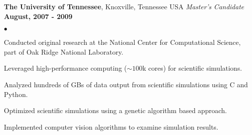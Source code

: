 \documentclass[margin,line, 11pt]{res}
\newenvironment{list2}{
  \begin{list}{$\bullet$}{%
      \setlength{\itemsep}{0in}
      \setlength{\parsep}{0in} \setlength{\parskip}{0in}
      \setlength{\topsep}{0in} \setlength{\partopsep}{0in}
      \setlength{\leftmargin}{0.2in}}}{\end{list}}
\begin{document}
\begin{resume}
\textbf{The University of Tennessee}, Knoxville, Tennessee USA\newline
\textit{Master's Candidate} \hfill \textbf{August, 2007 - 2009}\newline
    \begin{list2}
    	\vspace*{-5mm}
    	\item Conducted original research at the National Center for Computational Science, part of Oak Ridge National Laboratory.
      \item Leveraged high-performance computing ($\sim 100$k cores) for scientific simulations.
      \item Analyzed hundreds of GBs of data output from scientific simulations using C and Python.
      \item Optimized scientific simulations using a genetic algorithm based approach.
      \item Implemented computer vision algorithms to examine simulation results.
    \end{list2}
\vspace*{-4mm}

\end{resume}
\end{document}

